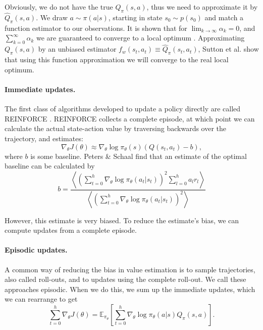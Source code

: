Obviously, we do not have the true $Q_\pi(s,a)$, thus we need to approximate it by $\hat{Q}_\pi(s,a)$. 
We draw $a \sim \pi(a|s)$, starting in state $s_0 \sim p(s_0)$ and match a function estimator to our observations.
It is shown that for $\lim_{k\to\infty}\alpha_k = 0$, and $\sum_{k=0}^\infty \alpha_k$ we are guaranteed to converge to a local optimum \cite{Sutton:1999:PGM:3009657.3009806}.
Approximating $Q_\pi(s,a)$ by an unbiased estimator $f_w(s_t, a_t) \equiv \hat{Q}_\pi(s_t, a_t)$, Sutton et al. \cite{Sutton:1999:PGM:3009657.3009806} show that using this function approximation we will converge to the real local optimum.

\paragraph{Immediate updates.} 
The first class of algorithms developed to update a policy directly are called REINFORCE \cite{Williams92simplestatistical}.
REINFORCE collects a complete episode, at which point we can calculate the actual state-action value by traversing backwards over the trajectory, and estimates:
\begin{equation}
	\nabla_\theta J(\theta) \approx \nabla_\theta\log\pi_\theta(s) \left(Q(s_t,a_t) - b \right),
	\label{eqn:reinforce}
\end{equation}
where $b$ is some baseline. 
Peters \& Schaal \cite{4867} find that an estimate of the optimal baseline can be calculated by
\begin{equation}
	b = \frac
		{\left\langle 
			\left(\sum_{t=0}^h \nabla_\theta \log\pi_\theta(a_t|s_t) \right)^2 \sum_{l=0}^h a_l r_l 
		\right\rangle}
		{\left\langle
			\left(\sum_{t=0}^h \nabla_\theta \log\pi_\theta(a_t|s_t) \right)^2
		\right\rangle}
\end{equation}

However, this estimate is very biased.
To reduce the estimate's bias, we can compute updates from a complete episode.

\paragraph{Episodic updates.} 
A common way of reducing the bias in value estimation is to sample trajectories, also called roll-outs, and to updates using the complete roll-out. 
We call these approaches episodic. 
When we do this, we sum up the immediate updates, which we can rearrange to get
\begin{equation}
  \sum_{t=0}^h \nabla_\theta J(\theta) = \mathbb{E}_{\pi_\theta}\left[\sum_{t=0}^h \nabla_\theta{\log\pi_\theta(a|s)}Q_\pi(s,a)\right].
  \label{eqn:egrad}
\end{equation}

